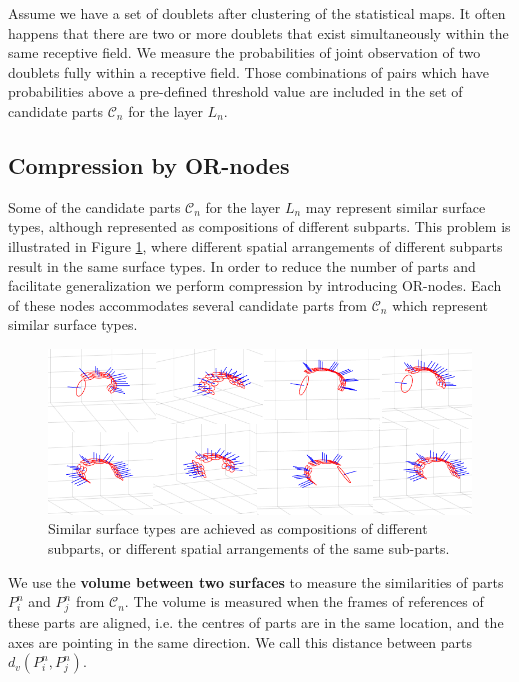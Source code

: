 \documentclass[runningheads]{llncs}
\begin{document}
Assume we have a set of doublets after clustering of the statistical
maps. It often happens that there are two or more doublets that
exist simultaneously within the same receptive field. We measure the
probabilities of joint observation of two doublets fully within a
receptive field. Those combinations of pairs which have
probabilities above a pre-defined threshold value are included in
the set of candidate parts $\mathcal{C}_n$ for the layer $L_n$.

\subsection{Compression by OR-nodes \label{sec:OR-nodes}}

Some of the candidate parts $\mathcal{C}_n$ for the layer $L_n$ may
represent similar surface types, although represented as
compositions of different subparts. This problem is illustrated in
Figure \ref{fig:OrNodes}, where different spatial arrangements of
different subparts result in the same surface types. In order to
reduce the number of parts and facilitate generalization we perform
compression by introducing OR-nodes. Each of these nodes
accommodates several candidate parts from $\mathcal{C}_n$ which
represent similar surface types.

\begin{figure}
\centering
\includegraphics[scale=0.6]{OrNode}
\caption{Similar surface types are achieved as compositions of
different subparts, or different spatial arrangements of the same
sub-parts.} \label{fig:OrNodes}
\end{figure}

We use the \textbf{volume between two surfaces} to measure the
similarities of parts $P_i^n$ and $P_j^n$ from $\mathcal{C}_n$. The
volume is measured when the frames of references of these parts are
aligned, i.e. the centres of parts are in the same location, and the
axes are pointing in the same direction. We call this distance
between parts $d_v(P_i^n, P_j^n)$.
\end{document}
